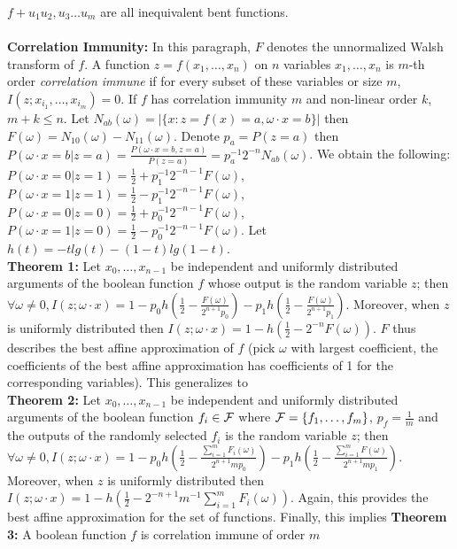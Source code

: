 $f+u_1 u_2, u_3 \ldots u_m$ are all inequivalent bent functions.\\
\\
{\bf Correlation Immunity:}
In this paragraph, $F$ denotes the unnormalized Walsh transform of $f$.  A function
$z=f(x_1 , \ldots , x_n)$ on $n$ variables 
$x_1, \ldots, x_n$ is $m$-th order \emph{correlation immune} if for every subset of these
variables or size $m$, $I(z; x_{i_1}, \ldots, x_{i_m})=0$.  If
$f$ has correlation immunity $m$ and non-linear order $k$, $m+k \le n$.  Let 
$N_{ab}(\omega)= | \{ x: z=f(x)=a, \omega \cdot x = b \} |$ then
$F(\omega)= N_{10}(\omega) - N_{11}(\omega)$.  Denote $p_a = P(z=a)$ then
$P(\omega \cdot x = b | z=a)=
{\frac {P(\omega \cdot x=b, z=a)} {P(z=a)}}=p_a^{-1}2^{-n} N_{ab}(\omega)$.  We obtain the
following:
$P(\omega \cdot x=0 | z=1)= {\frac 1 2} + p_1^{-1} 2^{-n-1} F(\omega)$,
$P(\omega \cdot x=1 | z=1)= {\frac 1 2} - p_1^{-1} 2^{-n-1} F(\omega)$,
$P(\omega \cdot x=0 | z=0)= {\frac 1 2} + p_0^{-1} 2^{-n-1} F(\omega)$,
$P(\omega \cdot x=1 | z=0)= {\frac 1 2} - p_0^{-1} 2^{-n-1} F(\omega)$.
Let $h(t)= - t lg(t) - (1-t) lg(1-t)$.  
\\
{\bf Theorem 1:}  Let $x_0, \ldots, x_{n-1}$ be
independent and uniformly distributed arguments of the boolean function $f$ whose output
is the random variable $z$; then $\forall \omega \ne 0,
I(z; \omega \cdot x)= 1 - p_0 h({\frac 1 2} - {\frac {F(\omega)} {2^{n+1} p_0}})
- p_1 h({\frac 1 2} - {\frac {F(\omega)} {2^{n+1} p_1}})$.  
Moreover, when $z$ is uniformly distributed then
$I(z; \omega \cdot x)= 1 - h({\frac 1 2} - 2^{-n} F(\omega))$.
$F$ thus describes
the best affine approximation of $f$ (pick $\omega$ with largest coefficient, the
coefficients of the best affine approximation has coefficients of 1 for the corresponding
variables).  This generalizes to
\\
{\bf Theorem 2:}  Let $x_0, \ldots, x_{n-1}$ be
independent and uniformly distributed arguments of the boolean function $f_i \in {\cal F}$ 
where ${\cal F} = \{ f_1 , \ldots , f_m \}$, $p_f= {\frac 1 m}$ and the 
outputs of the randomly selected $f_i$ is the random variable $z$; then $\forall \omega \ne 0,
I(z; \omega \cdot x)= 1 - p_0 h({\frac 1 2} - {\frac {\sum_{i=1}^m F_i(\omega)} {2^{n+1} m p_0}})
- p_1 h({\frac 1 2} - {\frac {\sum_{i=1}^m F(\omega)} {2^{n+1} m p_1}})$.  
Moreover, when $z$ is uniformly distributed then
$I(z; \omega \cdot x)= 1 - h({\frac 1 2} - 2^{-n+1} m^{-1} \sum_{i=1}^m F_i(\omega))$.
Again, this provides the best affine approximation for the set of functions.  Finally,
this implies {\bf Theorem 3:} A boolean function $f$ is correlation immune of order $m$
